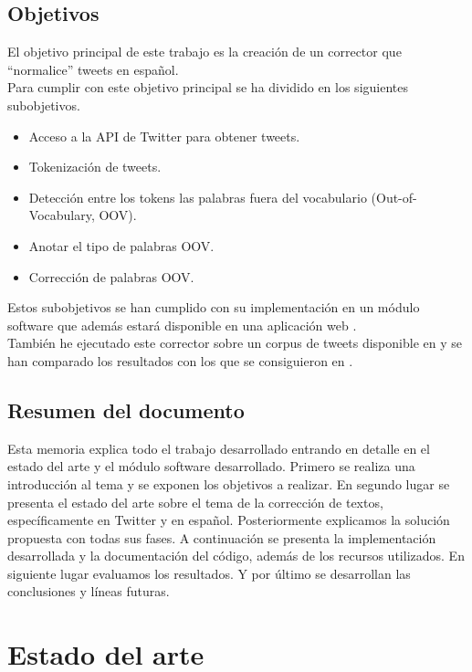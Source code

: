 \documentclass[spanish,12pt, a4paper,twoside]{paper}
\let\oldsection\section
\def\section{\cleardoublepage\oldsection}
\begin{document}
\subsection{Objetivos}\label{sec:objetivos}
El objetivo principal de este trabajo es la creación de un corrector que ``normalice'' tweets en español.\\Para cumplir con este objetivo principal se ha dividido en los siguientes subobjetivos.
\begin{itemize}
\item Acceso a la API de Twitter para obtener tweets.
\item Tokenización de tweets.
\item Detección entre los tokens las palabras fuera del vocabulario (Out-of-Vocabulary, OOV).
\item Anotar el tipo de palabras OOV.
\item Corrección de palabras OOV. 
\end{itemize}
Estos subobjetivos se han cumplido con su implementación en un módulo software que además estará disponible en una aplicación web \cite{tweetscweb}.\\

También he ejecutado este corrector sobre un corpus de tweets disponible en \cite{tweetnorm} y se han comparado los resultados con los que se consiguieron en \cite{alegria:2013}.

\subsection{Resumen del documento}\label{sec:resumen}
Esta memoria explica todo el trabajo desarrollado entrando en detalle en el estado del arte y el  módulo software desarrollado. Primero se realiza una introducción al tema y se exponen los objetivos a realizar. En segundo lugar se presenta el estado del arte sobre el tema de la corrección de textos, específicamente en Twitter y en español. Posteriormente explicamos la solución propuesta con todas sus fases. A continuación se presenta la implementación desarrollada y la documentación del código, además de los recursos utilizados. En siguiente lugar evaluamos los resultados. Y por último se desarrollan las conclusiones y líneas futuras.
\section{Estado del arte}\label{sec:estadodelarte}
\end{document}
